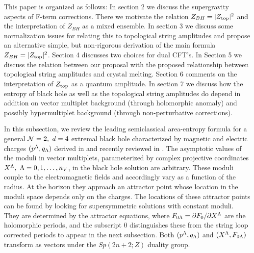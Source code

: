 This paper is organized as follows:  In section 2 we discuss the
supergravity aspects of F-term corrections.   There we motivate
the relation $Z_{BH}=|Z_{\rm top}|^2$ and the interpretation of
$Z_{BH}$ as a mixed ensemble.  In section 3 we discuss some
normalization issues for relating this to topological string
amplitudes and propose an alternative simple, but  non-rigorous
derivation of the main formula $Z_{BH}=|Z_{\rm top}|^2$. Section 4
discusses two choices for dual CFT's. In Section 5 we discuss the
relation between our proposal with the proposed relationship
between topological string amplitudes and crystal melting. Section
6 comments on the interpretation of $Z_{\rm top}$ as a quantum
amplitude. In section 7 we discuss how the entropy of black hole
as well as the topological string amplitudes do depend in addition
on vector multiplet background (through holomorphic anomaly) and
possibly hypermultiplet background (through non-perturbative
corrections).


 In this subsection, we
review the leading semiclassical area-entropy formula for a
general ${\cal N}=2,~d=4$ extremal black hole characterized by magnetic
and electric charges $(p^{\Lambda},q_{\Lambda})$ derived in  and
recently reviewed in \MooreFG. The asymptotic values of the moduli
in vector multiplets, parameterized by complex projective
coordinates $X^{\Lambda}, ~{\Lambda}=0,1,\dots,n_V$, in the black hole solution
are arbitrary. These moduli couple to the electromagnetic fields
and accordingly vary as a function of the radius. At the horizon
they approach an attractor point whose location in the moduli
space depends only on the charges. The locations of these
attractor points can be found by looking for supersymmetric
solutions with constant moduli. They are determined by the
attractor equations, \eqn{}
\eqn{} where $F_{0{\Lambda}}={\partial} F_0/{\partial} X^{\Lambda}$ are the
holomorphic periods, and the subscript $0$ distinguishes these
from the string loop
corrected periods to appear in the next subsection.
Both $(p^{\Lambda},q_{\Lambda})$ and $(X^{\Lambda},F_{0{\Lambda}})$
transform as vectors under the $Sp(2n+2;Z)$ duality group.

